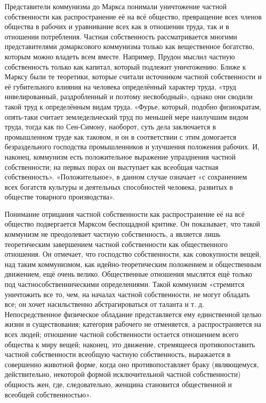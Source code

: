 \documentclass[12pt,a4paper,openany]{book}
\begin{document}
Представители коммунизма до Маркса понимали уничтожение частной собственности как распространение её на всё общество, превращение всех членов общества в рабочих и уравнивание всех как в отношении труда, так и в отношении потребления. Частная собственность рассматривается многими представителями домарксового коммунизма только как вещественное богатство, которым можно владеть всем вместе. Например, Прудон мыслил частную собственность только как капитал, который подлежит уничтожению. Ближе к Марксу были те теоретики, которые считали источником частной собственности и её губительного влияния на человека определённый характер труда, «труд нивелированный, раздробленный и поэтому несвободный», однако они сводили такой труд к определённым видам труда. «Фурье, который, подобно физиократам, опять-таки считает земледельческий труд по меньшей мере наилучшим видом труда, тогда как по Сен-Симону, наоборот, суть дела заключается в промышленном труде как таковом, и он в соответствии с этим домогается безраздельного господства промышленников и улучшения положения рабочих. И, наконец, коммунизм есть положительное выражение упразднения частной собственности; на первых порах он выступает как всеобщая частная собственность». «Положительное», в данном случае означает «с сохранением всех богатств культуры и деятельных способностей человека, развитых в обществе товарного производства».

Понимание отрицания частной собственности как распространение её на всё общество подвергается Марксом беспощадной критике. Он показывает, что такой коммунизм не преодолевает частную собственность, а является лишь теоретическим завершением частной собственности как общественного отношения. Он отмечает, что господство собственности, как совокупности вещей, над таким коммунизмом, как идейно-теоретическим положением и общественным движением, ещё очень велико. Общественные отношения мыслятся ещё только под частнособственническими определениями. Такой коммунизм «стремится уничтожить все то, чем, на началах частной собственности, не могут обладать все; он хочет насильственно абстрагироваться от таланта и т. д. Непосредственное физическое обладание представляется ему единственной целью жизни и существования; категория рабочего не отменяется, а распространяется на всех людей; отношение частной собственности остается отношением всего общества к миру вещей; наконец, это движение, стремящееся противопоставить частной собственности всеобщую частную собственность, выражается в совершенно животной форме, когда оно противопоставляет браку (являющемуся, действительно, некоторой формой исключительной частной собственности) общность жен, где, следовательно, женщина становится общественной и всеобщей собственностью».
\end{document}
